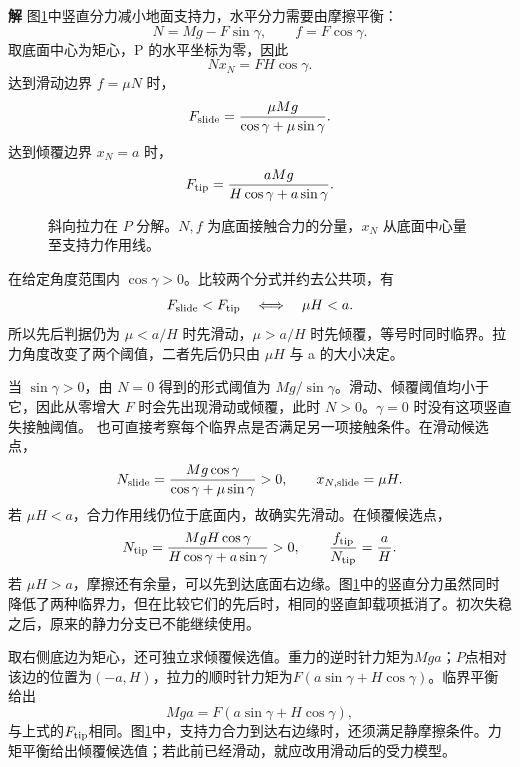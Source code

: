 \documentclass[11pt,openany,fontset=fandol]{ctexbook}
\theoremstyle{definition}\newtheorem{example}{例}[chapter]\newtheorem{exercise}{习题}[chapter]
\newcommand{\SolutionStart}{\par\medskip\ifdim\pagetotal>0pt\ifdim\dimexpr\pagegoal-\pagetotal\relax<3\baselineskip\newpage\fi\fi\noindent\textbf{解}\quad\ignorespaces}
\newenvironment{solution}{\SolutionStart}{\par\medskip}
\begin{document}
\begin{solution}
图\ref{mp5:fig:l5-h8-s}中竖直分力减小地面支持力，水平分力需要由摩擦平衡：
\[
N=Mg-F\sin\gamma,\qquad f=F\cos\gamma.
\]
取底面中心为矩心，P 的水平坐标为零，因此
\[
Nx_N=FH\cos\gamma.
\]
达到滑动边界 $f=\mu N$ 时，
\[
F_{\rm slide}=\frac{\mu Mg}{\cos\gamma+\mu\sin\gamma}.
\]
达到倾覆边界 $x_N=a$ 时，
\[
F_{\rm tip}=\frac{aMg}{H\cos\gamma+a\sin\gamma}.
\]

\begin{figure}[H]\centering
{}
\caption{斜向拉力在 $P$ 分解。$N,f$ 为底面接触合力的分量，$x_N$ 从底面中心量至支持力作用线。}\label{mp5:fig:l5-h8-s}
\end{figure}

在给定角度范围内 $\cos\gamma>0$。比较两个分式并约去公共项，有
\[
F_{\rm slide}<F_{\rm tip}\quad\Longleftrightarrow\quad\mu H<a.
\]
所以先后判据仍为 $\mu<a/H$ 时先滑动，$\mu>a/H$ 时先倾覆，等号时同时临界。拉力角度改变了两个阈值，二者先后仍只由 $\mu H$ 与 a 的大小决定。

当 $\sin\gamma>0$，由 $N=0$ 得到的形式阈值为 $Mg/\sin\gamma$。滑动、倾覆阈值均小于它，因此从零增大 $F$ 时会先出现滑动或倾覆，此时 $N>0$。$\gamma=0$ 时没有这项竖直失接触阈值。
也可直接考察每个临界点是否满足另一项接触条件。在滑动候选点，
\[
N_{\rm slide}=\frac{Mg\cos\gamma}{\cos\gamma+\mu\sin\gamma}>0,
\qquad x_{N,\rm slide}=\mu H.
\]
若 $\mu H<a$，合力作用线仍位于底面内，故确实先滑动。在倾覆候选点，
\[
N_{\rm tip}=\frac{MgH\cos\gamma}{H\cos\gamma+a\sin\gamma}>0,
\qquad \frac{f_{\rm tip}}{N_{\rm tip}}=\frac aH.
\]
若 $\mu H>a$，摩擦还有余量，可以先到达底面右边缘。图\ref{mp5:fig:l5-h8-s}中的竖直分力虽然同时降低了两种临界力，但在比较它们的先后时，相同的竖直卸载项抵消了。初次失稳之后，原来的静力分支已不能继续使用。

取右侧底边为矩心，还可独立求倾覆候选值。重力的逆时针力矩为$Mga$；$P$点相对该边的位置为$(-a,H)$，拉力的顺时针力矩为$F(a\sin\gamma+H\cos\gamma)$。临界平衡给出
\[
 Mga=F(a\sin\gamma+H\cos\gamma),
\]
与上式的$F_{\rm tip}$相同。图\ref{mp5:fig:l5-h8-s}中，支持力合力到达右边缘时，还须满足静摩擦条件。力矩平衡给出倾覆候选值；若此前已经滑动，就应改用滑动后的受力模型。
\end{solution}
\end{document}
